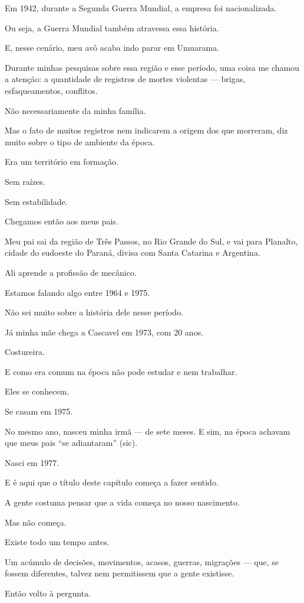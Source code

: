 Em 1942, durante a Segunda Guerra Mundial, a empresa foi nacionalizada.

Ou seja, a Guerra Mundial também atravessa essa história.

E, nesse cenário, meu avô acaba indo parar em Umuarama.

Durante minhas pesquisas sobre essa região e esse período, uma coisa me chamou a atenção: a quantidade de registros de mortes violentas — brigas, esfaqueamentos, conflitos.

Não necessariamente da minha família.

Mas o fato de muitos registros nem indicarem a origem dos que morreram, diz muito sobre o tipo de ambiente da época.

Era um território em formação.

Sem raízes.

Sem estabilidade.

Chegamos então aos meus pais.

Meu pai sai da região de Três Passos, no Rio Grande do Sul, e vai para Planalto, cidade do sudoeste do Paraná, divisa com Santa Catarina e Argentina.

Ali aprende a profissão de mecânico.

Estamos falando algo entre 1964 e 1975.

Não sei muito sobre a história dele nesse período.

Já minha mãe chega a Cascavel em 1973, com 20 anos. 

Costureira. 

E como era comum na época não pode estudar e nem trabalhar.

Eles se conhecem.


Se casam em 1975.

No mesmo ano, nasceu minha irmã — de sete meses. E sim, na época achavam que meus pais “se adiantaram” (sic).

Nasci em 1977.

E é aqui que o título deste capítulo começa a fazer sentido.

A gente costuma pensar que a vida começa no nosso nascimento.

Mas não começa.

Existe todo um tempo antes.

Um acúmulo de decisões, movimentos, acasos, guerras, migrações — que, se fossem diferentes, talvez nem permitissem que a gente existisse.

Então volto à pergunta.

